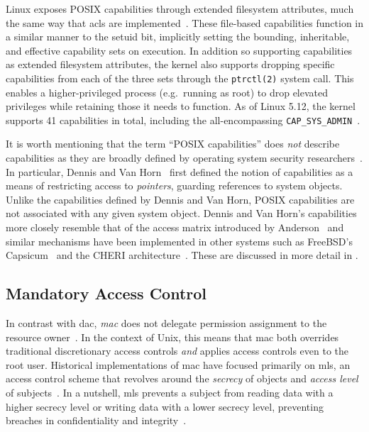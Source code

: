 Linux exposes POSIX capabilities through extended filesystem attributes, much the same way
that \glspl{acl} are implemented~\cite{corbet2006_capabities_b}. These file-based
capabilities function in a similar manner to the setuid bit, implicitly setting the
bounding, inheritable, and effective capability sets on execution. In addition so
supporting capabilities as extended filesystem attributes, the kernel also supports
dropping specific capabilities from each of the three sets through the \texttt{ptrctl(2)}
system call. This enables a higher-privileged process (e.g.~running as root) to drop
elevated privileges while retaining those it needs to function. As of Linux 5.12, the
kernel supports 41 capabilities in total, including the all-encompassing
\texttt{CAP\_SYS\_ADMIN}~\cite{linux_capability_h}.

It is worth mentioning that the term \enquote{POSIX capabilities} does \textit{not}
describe capabilities as they are broadly defined by operating system security
researchers~\cite{anderson2017_comparison}. In particular, Dennis and Van
Horn~\cite{dennis1966_semantics} first defined the notion of capabilities as a means of
restricting access to \textit{pointers}, guarding references to system objects. Unlike the
capabilities defined by Dennis and Van Horn, POSIX capabilities are not associated with
any given system object. Dennis and Van Horn's capabilities more closely resemble that of
the access matrix introduced by Anderson~\cite{anderson1972_report} and similar mechanisms
have been implemented in other systems such as FreeBSD's
Capsicum~\cite{watson2010_capsicum} and the CHERI architecture~\cite{watson2015_cheri,
davis2019_cheriabi}. These are discussed in more detail in .

\subsection{Mandatory Access Control}%
\label{ss:mac}

In contrast with \gls{dac}, \textit{\gls{mac}} does not delegate permission assignment to
the resource owner~\cite{spencer1999_flask, van_oorschot2020_tools_jewels,
jaeger2008_os_security}. In the context of Unix, this means that \gls{mac} both overrides
traditional discretionary access controls \textit{and} applies access controls even to the
root user. Historical implementations of \gls{mac} have focused primarily on \gls{mls}, an
access control scheme that revolves around the \textit{secrecy} of objects and
\textit{access level} of subjects~\cite{bell2005_blp}. In a nutshell, \gls{mls} prevents
a subject from reading data with a higher secrecy level or writing data with a lower
secrecy level, preventing breaches in confidentiality and
integrity~\cite{jaeger2008_os_security}.

